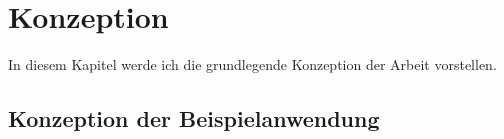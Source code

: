 \chapter{Konzeption}
In diesem Kapitel werde ich die grundlegende Konzeption der Arbeit vorstellen.

\section{Konzeption der Beispielanwendung}